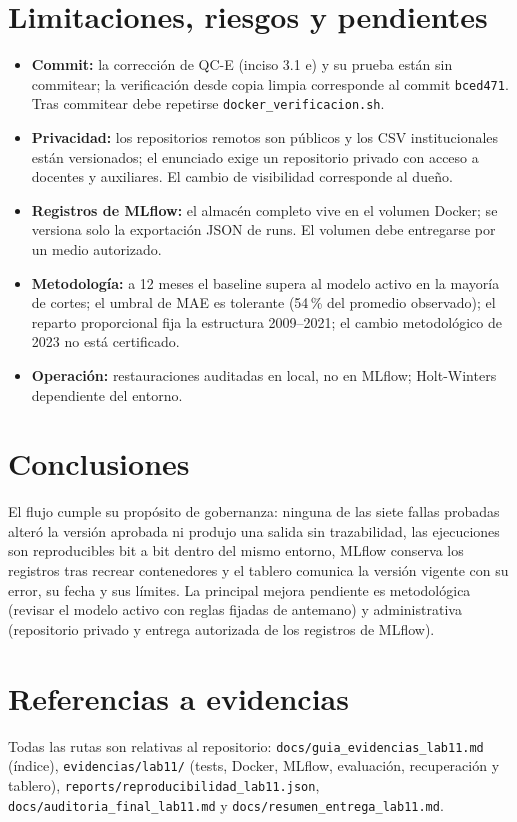 \documentclass[11pt,a4paper]{article}
\newcommand{\cod}[1]{\texttt{\small #1}}
\begin{document}
\section{Limitaciones, riesgos y pendientes}
\begin{itemize}
\item \textbf{Commit:} la corrección de QC-E (inciso 3.1 e) y su prueba están sin commitear; la verificación desde copia limpia corresponde al commit \cod{bced471}. Tras commitear debe repetirse \cod{docker\_verificacion.sh}.
\item \textbf{Privacidad:} los repositorios remotos son públicos y los CSV institucionales están versionados; el enunciado exige un repositorio privado con acceso a docentes y auxiliares. El cambio de visibilidad corresponde al dueño.
\item \textbf{Registros de MLflow:} el almacén completo vive en el volumen Docker; se versiona solo la exportación JSON de runs. El volumen debe entregarse por un medio autorizado.
\item \textbf{Metodología:} a 12 meses el baseline supera al modelo activo en la mayoría de cortes; el umbral de MAE es tolerante (54\,\% del promedio observado); el reparto proporcional fija la estructura 2009--2021; el cambio metodológico de 2023 no está certificado.
\item \textbf{Operación:} restauraciones auditadas en local, no en MLflow; Holt-Winters dependiente del entorno.
\end{itemize}

\section{Conclusiones}
El flujo cumple su propósito de gobernanza: ninguna de las siete fallas probadas alteró la versión aprobada ni produjo una salida sin trazabilidad, las ejecuciones son reproducibles bit a bit dentro del mismo entorno, MLflow conserva los registros tras recrear contenedores y el tablero comunica la versión vigente con su error, su fecha y sus límites. La principal mejora pendiente es metodológica (revisar el modelo activo con reglas fijadas de antemano) y administrativa (repositorio privado y entrega autorizada de los registros de MLflow).

\section*{Referencias a evidencias}
Todas las rutas son relativas al repositorio: \cod{docs/guia\_evidencias\_lab11.md} (índice), \cod{evidencias/lab11/} (tests, Docker, MLflow, evaluación, recuperación y tablero), \cod{reports/reproducibilidad\_lab11.json}, \cod{docs/auditoria\_final\_lab11.md} y \cod{docs/resumen\_entrega\_lab11.md}.
\end{document}
